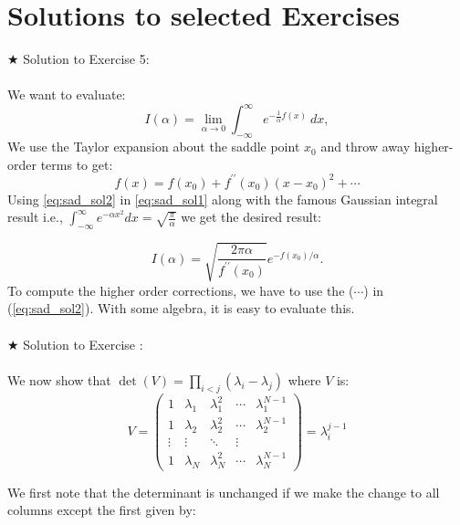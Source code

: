 \documentclass[11pt]{article}
\begin{document}
\section{Solutions to selected Exercises} 

$\bigstar$ Solution to Exercise 5:
\\ \\ 
We want to evaluate: 
\begin{equation}
	\label{eq:sad_sol1} 
	I(\alpha) = \lim_{\alpha \to 0} \int_{-\infty}^{\infty} e^{-\frac{1}{\alpha}f(x)} ~dx, 
\end{equation}
We use the Taylor expansion about the saddle point $x_{0}$ and throw away higher-order terms to get:
\begin{equation}
	\label{eq:sad_sol2}
	f(x) = f(x_{0}) + f^{\prime\prime}(x_{0}) (x-x_0)^{2} + \cdots 
\end{equation}
Using \ref{eq:sad_sol2} in \ref{eq:sad_sol1} along with the famous Gaussian integral result i.e.,  $\int_{-\infty}^{\infty} e^{-\alpha x^2} dx = \sqrt{\frac{\pi}{\alpha}}$ we get the desired result:

\begin{equation}
	\label{eq:sad_sol1} 
	I(\alpha) =  \sqrt{\frac{2\pi \alpha}{f^{\prime\prime}(x_{0})}} e^{-f(x_{0})/\alpha}. 
\end{equation}
To compute the higher order corrections, we have to use the ($\cdots$) in (\ref{eq:sad_sol2}). With some algebra, it is easy to evaluate this. \\ \\ 
\noindent $\bigstar$ Solution to Exercise :
\\ \\ 
We now show that $\det(V) = \prod_{i<j} (\lambda_i - \lambda_j)$ where $V$ is: 
\begin{equation*}
	V = 
	\begin{pmatrix}
		1 & \lambda_1 & \lambda_{1}^{2} & \cdots & \lambda_{1}^{N-1} \\
		1 & \lambda_2 & \lambda_{2}^{2} & \cdots & \lambda_{2}^{N-1} \\ 
		\vdots  & \vdots  & \ddots & \vdots  \\
		1 & \lambda_N & \lambda_{N}^{2} & \cdots & \lambda_{N}^{N-1} 
	\end{pmatrix} = \lambda_{i}^{j-1} 
\end{equation*}

We first note that the determinant is unchanged
if we make the change to all columns except the first given by:
\end{document}
